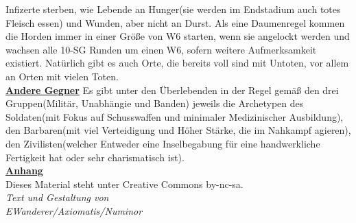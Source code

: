 \documentclass[twoside,a4paper]{minimal}
\begin{document}
\begin{multicols*}{3}
Infizerte sterben, wie Lebende an Hunger(sie werden im Endstadium auch totes Fleisch essen) und Wunden, aber nicht an Durst. Als eine Daumenregel kommen die Horden immer in einer Größe von W6 starten, wenn sie angelockt werden und wachsen alle 10-SG Runden um einen W6, sofern weitere Aufmerksamkeit existiert. Natürlich gibt es auch Orte, die bereits voll sind mit Untoten, vor allem an Orten mit vielen Toten.
\textbf{\uline{\\Andere Gegner}}
Es gibt unter den Überlebenden in der Regel gemäß den drei Gruppen(Militär, Unabhängie und Banden) jeweils die Archetypen des Soldaten(mit Fokus auf Schusswaffen und minimaler Medizinischer Ausbildung), den Barbaren(mit viel Verteidigung und Höher Stärke, die im Nahkampf agieren), den Zivilisten(welcher Entweder eine Inselbegabung für eine handwerkliche Fertigkeit hat oder sehr charismatisch ist).
\textbf{\uline{\\Anhang}}
\\Dieses Material steht unter Creative Commons by-nc-sa.
\textit{\\Text und Gestaltung von\\EWanderer/Axiomatis/Numinor}
\end{multicols*}
\end{document}
